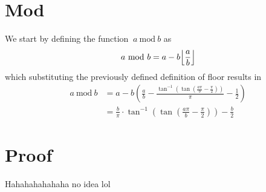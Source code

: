 \documentclass[11pt]{article}
\DeclarePairedDelimiter\floor{\lfloor}{\rfloor}
\newcommand{\Mod}[2]{\ #1\ \mathrm{mod}\ #2}
\begin{document}
\section{Mod}
We start by defining the function \(\Mod{a}{b}\) as
\[\Mod{a}{b}=a-b\floor*{\frac{a}{b}}\]
which substituting the previously defined definition of floor results in
\begin{equation*}
\begin{split}
\Mod{a}{b}&=a-b(\frac{a}{b}-\frac{\tan^{\mathrm{-1}}(\tan(\frac{a\pi}{b}-\frac{\pi}{2}))}{\pi}-\frac{1}{2})
\\&=\frac{b}{\pi}\cdot\tan^{\mathrm{-1}}(\tan(\frac{a\pi}{b}-\frac{\pi}{2}))-\frac{b}{2}
\end{split}
\end{equation*}
\section{Proof}
Hahahahahahaha no idea lol
\end{document}
